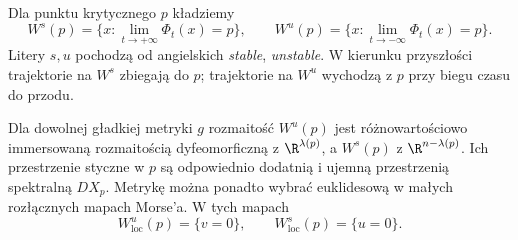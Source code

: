 \begin{definicja}
\label{def:stable-morse-17}
Dla punktu krytycznego $p$ kładziemy
\[
 W^s(p)=\{x:\lim_{t\to+\infty}\Phi_t(x)=p\},
 \qquad
 W^u(p)=\{x:\lim_{t\to-\infty}\Phi_t(x)=p\}.
\]
Litery $s,u$ pochodzą od
angielskich \emph{stable}, \emph{unstable}.
W kierunku przyszłości trajektorie
na $W^s$ zbiegają do $p$;
trajektorie na $W^u$ wychodzą z $p$
przy biegu czasu do przodu.
\end{definicja}

\begin{twierdzenie}
\label{thm:stable-morse-17}
Dla dowolnej gładkiej metryki $g$ rozmaitość
$W^u(p)$ jest różnowartościowo
immersowaną rozmaitością
dyfeomorficzną z $\R^{\lambda(p)}$,
a $W^s(p)$ z $\R^{n-\lambda(p)}$.
Ich przestrzenie styczne w $p$ są odpowiednio
dodatnią i ujemną przestrzenią spektralną $DX_p$.
Metrykę można ponadto wybrać euklidesową
w małych rozłącznych mapach Morse'a. W tych mapach
\[
 W^u_{\mathrm{loc}}(p)=\{v=0\},
 \qquad
 W^s_{\mathrm{loc}}(p)=\{u=0\}.
\]
\end{twierdzenie}
